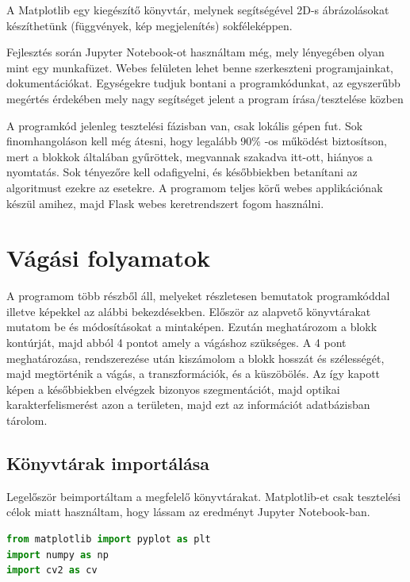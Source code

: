 \documentclass[a4paper,12pt]{article}
\begin{document}
A Matplotlib egy kiegészítő könyvtár, melynek segítségével 2D-s ábrázolásokat készíthetünk (függvények, kép megjelenítés) sokféleképpen. 

Fejlesztés során Jupyter Notebook-ot használtam még, mely lényegében olyan mint egy munkafüzet. Webes felületen lehet benne szerkeszteni programjainkat, dokumentációkat. Egységekre tudjuk bontani a programkódunkat, az egyszerűbb megértés érdekében mely nagy segítséget jelent a program írása/tesztelése közben

A programkód jelenleg tesztelési fázisban van, csak lokális gépen fut. Sok finomhangoláson kell még átesni, hogy legalább 90\% -os működést biztosítson, mert a blokkok általában gyűröttek, megvannak szakadva itt-ott, hiányos a nyomtatás. Sok tényezőre kell odafigyelni, és későbbiekben betanítani az algoritmust  ezekre az esetekre. A programom teljes körű webes applikációnak készül amihez, majd Flask webes keretrendszert fogom használni. 

\newpage
\section{Vágási folyamatok}
A programom több részből áll, melyeket részletesen bemutatok programkóddal illetve képekkel az alábbi bekezdésekben. Először az alapvető könyvtárakat mutatom be és módosításokat a mintaképen. Ezután meghatározom a blokk kontúrját, majd abból 4 pontot amely a vágáshoz szükséges. A 4 pont meghatározása, rendszerezése után kiszámolom a blokk hosszát és szélességét, majd megtörténik a vágás, a transzformációk, és a küszöbölés. Az így kapott képen a későbbiekben elvégzek bizonyos szegmentációt, majd optikai karakterfelismerést azon a területen, majd ezt az információt adatbázisban tárolom. 

\subsection{Könyvtárak importálása}
Legelőször beimportáltam a megfelelő könyvtárakat. Matplotlib-et csak tesztelési célok miatt használtam, hogy lássam az eredményt Jupyter Notebook-ban. 
\begin{lstlisting}[language=Python, caption=Könvytárak importálása]
from matplotlib import pyplot as plt
import numpy as np
import cv2 as cv
\end{lstlisting}
\end{document}
